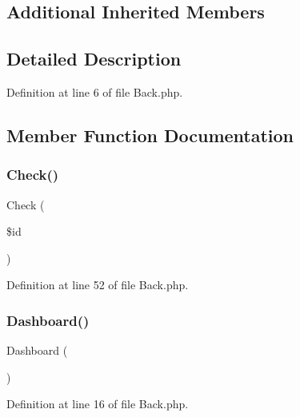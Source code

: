 \subsection*{Additional Inherited Members}


\subsection{Detailed Description}


Definition at line 6 of file Back.\+php.



\subsection{Member Function Documentation}
\mbox{\label{class_src_1_1_controllers_1_1_back_a384a1ec9e22b88a73de48023bb2bbf4f}} 
\subsubsection{Check()}
{\footnotesize\ttfamily Check (\begin{DoxyParamCaption}\item[{}]{\$id }\end{DoxyParamCaption})}



Definition at line 52 of file Back.\+php.

\mbox{\label{class_src_1_1_controllers_1_1_back_a405a66825259e2e811a2011a61c2beff}} 
\subsubsection{Dashboard()}
{\footnotesize\ttfamily Dashboard (\begin{DoxyParamCaption}{ }\end{DoxyParamCaption})}



Definition at line 16 of file Back.\+php.

\mbox{\label{class_src_1_1_controllers_1_1_back_ac36db983080e1b0934908febca5de2d9}} 
